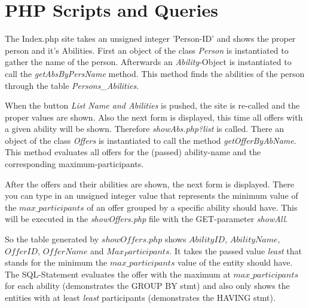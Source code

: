 \documentclass[12pt,a4paper,english]{article}
\begin{document}
\lstset{language=HTML}


\section{PHP Scripts and Queries} \label{sec:php}
The Index.php site takes an unsigned integer 'Person-ID' and shows the proper person and it's Abilities. First an object 
of the class \textit{Person} is instantiated to gather the name of the person. Afterwards an \textit{Ability}-Object is instantiated to 
call the \textit{getAbsByPersName} method. This method finds the abilities of the person through the table \emph{Persons\_Abilities}.




When the button \textit{List Name and Abilities} is pushed, the site is re-called and the proper values are shown. Also the next 
form is displayed, this time all offers with a given ability will be shown. Therefore \textit{showAbs.php?list} is called. \newline
There an object of the class \textit{Offers} is instantiated to call the method \textit{getOfferByAbName}. This method evaluates all 
offers for the (passed) ability-name and the corresponding maximum-participants.




After the offers and their abilities are shown, the next form is displayed. There you can type in an unsigned integer value 
that represents the minimum value of the \textit{$max\_participants$} of an offer grouped by a specific ability should have.
This will be executed in the \textit{showOffers.php} file with the GET-parameter \textit{showAll}. \newline

So the table generated by \textit{$showOffers.php$} shows \textit{$Ability ID$}, \textit{$Ability Name$}, \textit{$Offer ID$}, \textit{$Offer Name$} and \textit{$Max_Participants$}. 
It takes the passed value \textit{least} that stands for the minimum the \textit{$max\_participants$} value of the entity should have. 
The SQL-Statement evaluates the offer with the maximum at \textit{$max\_participants$} for each ability (demonstrates the GROUP BY stmt) and 
also only shows the entities with at least \textit{least} participants (demonstrates the HAVING stmt).\newline
\end{document}
